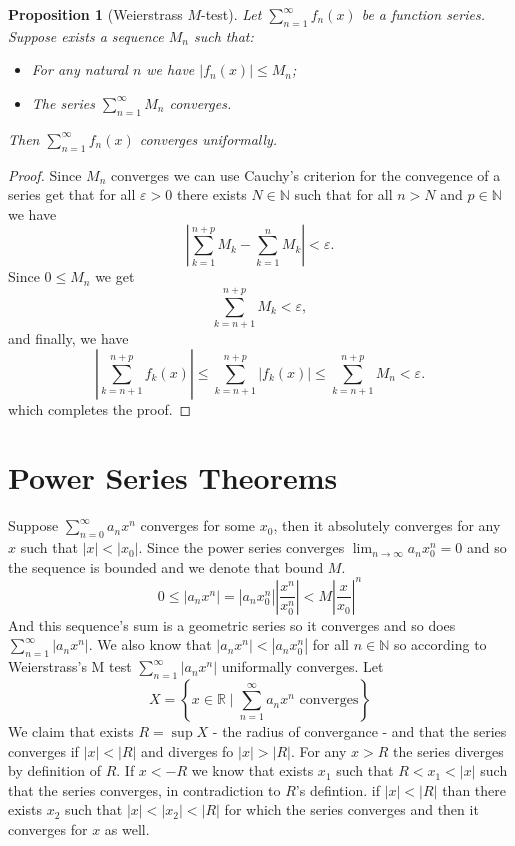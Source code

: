 \documentclass[11pt,a4paper]{article}
\theoremstyle{definition}
\theoremstyle{plain}
\newtheorem{proposition}[theorem]{Proposition}
\newcommand{\N}{\mathbb{N}}
\newcommand{\R}{\mathbb{R}}
\newcommand{\set}[2]{ \left\{ #1 \mid #2 \right\} }
\newcommand{\abs}[1]{\left\lvert #1\right\rvert}
\begin{document}
  \begin{proposition}[Weierstrass $M$-test]
    Let $\sum_{n=1}^{\infty}{f_n(x)}$ be a function series. 
    Suppose exists a sequence $M_n$ such that:
    \begin{itemize}
        \item For any natural $n$ we have $|f_n(x)| \le M_n$;
        \item The series $\sum_{n=1}^{\infty}{M_n}$ converges.
    \end{itemize}
    Then $\sum_{n=1}^\infty f_n(x)$ converges uniformally.
  \end{proposition}
  \begin{proof}
    Since $M_n$ converges we can use Cauchy's criterion for the convegence 
    of a series get that for all $\varepsilon > 0$ there exists $N \in \N$
    such that for all $n > N$ and $p \in \N$ we have
    \[
      \abs{\sum_{k=1}^{n+p} M_k - \sum_{k=1}^{n} M_k} < \varepsilon.
    \]
    Since $0 \le M_n$ we get
    \[
      \sum_{k=n+1}^{n+p} M_k < \varepsilon,
    \]
    and finally, we have
    \[
      \abs{\sum_{k=n+1}^{n+p} f_k(x)}   \le 
      \sum_{k=n+1}^{n+p} \abs{f_k(x)} \le 
      \sum_{k=n+1}^{n+p} M_n < \varepsilon.
    \]
    which completes the proof.
  \end{proof}
		
	\newpage
	
	\section{Power Series Theorems}
	Suppose $\sum_{n=0}^\infty a_nx^n$ converges for some $x_0$, 
	then it absolutely converges for any $x$ such that $|x|<|x_0|$.
	Since the power series converges $\lim_{n\to\infty}{a_nx_0^n}=0$ 
	and so the sequence is bounded 
	and we denote that bound $M$.
	\[
		0 \le |a_nx^n| 
		= |a_nx_0^n|\left|\frac{x^n}{x_0^n}\right| 
		< M\left|\frac{x}{x_0}\right|^n
	\]
	And this sequence's sum is a geometric series so it converges and so does 
	$\sum_{n=1}^\infty|a_nx^n|$. 
	We also know that $|a_nx^n| < |a_nx_0^n|$ for all $n\in\N$ so according to 
	Weierstrass's M test $\sum_{n=1}^\infty|a_nx^n|$ uniformally converges. 
	Let
	\[
    X = \set{x \in \R}{\sum_{n=1}^\infty{a_n x^n}\text{ converges}}
	\]
	We claim that exists $R = \sup X$ - the radius of convergance - 
	and that the series converges if $|x|<|R|$ and diverges fo $|x|>|R|$. 
	For any $x>R$ the series diverges by definition of $R$. 
	If $x < -R$ we know that exists $x_1$ such that $R < x_1 < |x|$ such that 
	the series converges, in contradiction to $R$'s defintion. 
	if $|x|<|R|$ than there exists $x_2$ such that $|x|<|x_2|<|R|$ 
	for which the series converges and then it converges for $x$ as well.
	
\end{document}
